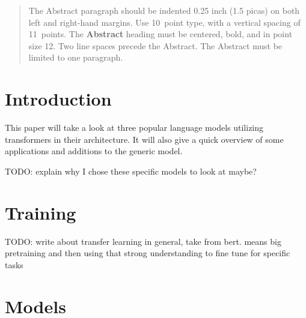 \documentclass[twoside]{article}
\begin{document}
%

%


\begin{abstract}
  The Abstract paragraph should be indented 0.25 inch (1.5 picas) on
  both left and right-hand margins. Use 10~point type, with a vertical
  spacing of 11~points.  The {\bf Abstract} heading must be centered,
  bold, and in point size 12. Two line spaces precede the
  Abstract. The Abstract must be limited to one paragraph.
\end{abstract}

\section{Introduction}
This paper will take a look at three popular language models utilizing
transformers in their architecture. It will also give a quick overview
of some applications and additions to the generic model.

TODO: explain why I chose these specific models to look at maybe?

\section{Training}
TODO: write about transfer learning in general, take from bert.
means big pretraining and then using that strong understanding
to fine tune for specific tasks

\section{Models}
\end{document}
